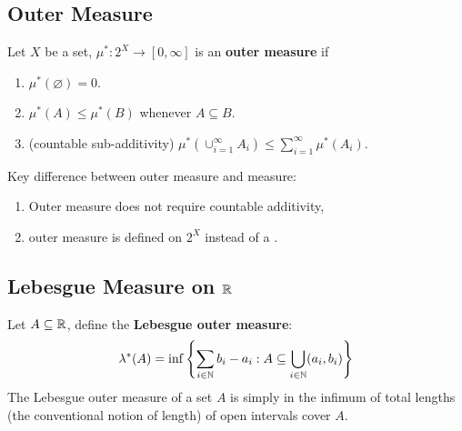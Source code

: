 \documentclass[11pt]{article}
\begin{document}
	\subsection{Outer Measure}
	\begin{definition}
		Let $X$ be a set, $\mu^*: 2^X \to [0, \infty]$ is an \textbf{outer measure} if
		\begin{enumerate}
			\item $\mu^*(\varnothing) = 0$.
			\item $\mu^*(A) \leq \mu^*(B)$ whenever $A \subseteq B$.
			\item (countable sub-additivity) $\mu^*(\cup_{i=1}^\infty A_i) \leq \sum_{i=1}^\infty \mu^*(A_i)$.
		\end{enumerate}
		Key difference between outer measure and measure:
		\begin{enumerate}
			\item Outer measure does not require countable additivity,
			\item outer measure is defined on $2^X$ instead of a \salg.
		\end{enumerate}
	\end{definition}
	
	\begin{example}
		
	\end{example}
	
	\subsection{Lebesgue Measure on $\mathbb{R}$}
	\begin{definition}
		Let $A \subseteq \mathbb{R}$, define the \textbf{Lebesgue outer measure}:
		\begin{align}
			\lambda^*(A) = \inf \left\{
			\sum_{i \in \mathbb{N}} b_i - a_i : A \subseteq \bigcup_{i \in \mathbb{N}} (a_i, b_i)
			\right\}
		\end{align}
		The Lebesgue outer measure of a set $A$ is simply in the infimum of total lengths (the conventional notion of length) of open intervals cover $A$.
	\end{definition}
	
\end{document}
